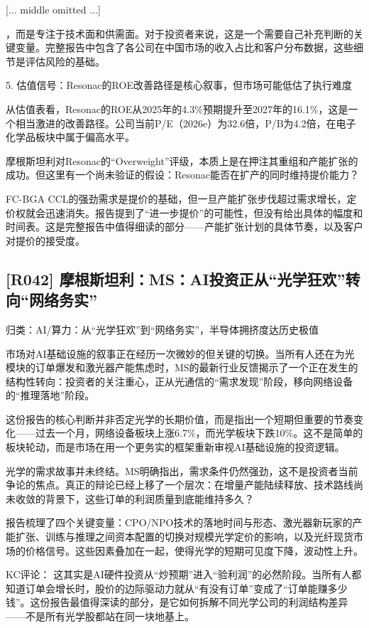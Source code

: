 \documentclass[11pt]{ctexart}
\begin{document}
[... middle omitted ...]

，而是专注于技术面和供需面。对于投资者来说，这是一个需要自己补充判断的关键变量。完整报告中包含了各公司在中国市场的收入占比和客户分布数据，这些细节是评估风险的基础。

5. 估值信号：Resonac的ROE改善路径是核心叙事，但市场可能低估了执行难度

从估值表看，Resonac的ROE从2025年的4.3\%预期提升至2027年的16.1\%，这是一个相当激进的改善路径。公司当前P/E（2026e）为32.6倍，P/B为4.2倍，在电子化学品板块中属于偏高水平。

摩根斯坦利对Resonac的“Overweight”评级，本质上是在押注其重组和产能扩张的成功。但这里有一个尚未验证的假设：Resonac能否在扩产的同时维持提价能力？

FC-BGA CCL的强劲需求是提价的基础，但一旦产能扩张步伐超过需求增长，定价权就会迅速消失。报告提到了“进一步提价”的可能性，但没有给出具体的幅度和时间表。这是完整报告中值得细读的部分——产能扩张计划的具体节奏，以及客户对提价的接受度。

\subsection{[R042] 摩根斯坦利：MS：AI投资正从“光学狂欢”转向“网络务实”}
{\small\color{refgray}归类：AI/算力：从“光学狂欢”到“网络务实”，半导体拥挤度达历史极值}

市场对AI基础设施的叙事正在经历一次微妙的但关键的切换。当所有人还在为光模块的订单爆发和激光器产能焦虑时，MS的最新行业反馈揭示了一个正在发生的结构性转向：投资者的关注重心，正从光通信的“需求发现”阶段，移向网络设备的“推理落地”阶段。

这份报告的核心判断并非否定光学的长期价值，而是指出一个短期但重要的节奏变化——过去一个月，网络设备板块上涨6.7\%，而光学板块下跌10\%。这不是简单的板块轮动，而是市场在用一个更务实的框架重新审视AI基础设施的投资逻辑。

光学的需求故事并未终结。MS明确指出，需求条件仍然强劲，这不是投资者当前争论的焦点。真正的辩论已经上移了一个层次：在增量产能陆续释放、技术路线尚未收敛的背景下，这些订单的利润质量到底能维持多久？

报告梳理了四个关键变量：CPO/NPO技术的落地时间与形态、激光器新玩家的产能扩张、训练与推理之间资本配置的切换对规模光学定价的影响，以及光纤现货市场的价格信号。这些因素叠加在一起，使得光学的短期可见度下降，波动性上升。

KC评论： 这其实是AI硬件投资从“炒预期”进入“验利润”的必然阶段。当所有人都知道订单会增长时，股价的边际驱动力就从“有没有订单”变成了“订单能赚多少钱”。这份报告最值得深读的部分，是它如何拆解不同光学公司的利润结构差异——不是所有光学股都站在同一块地基上。
\end{document}
